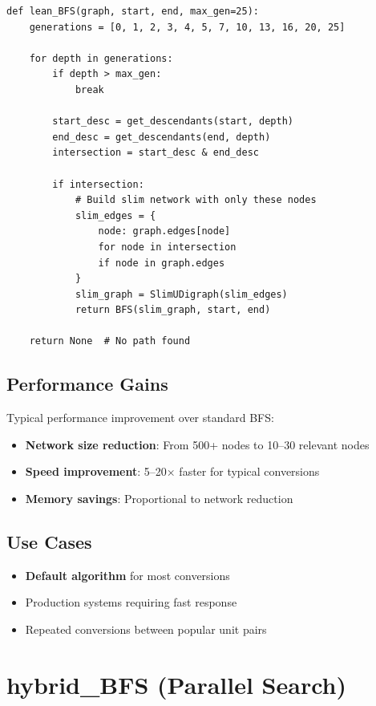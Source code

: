 \documentclass[11pt,a4paper]{report}
\begin{document}
\begin{lstlisting}[style=pythonstyle, caption={lean\_BFS network filtering}]
def lean_BFS(graph, start, end, max_gen=25):
    generations = [0, 1, 2, 3, 4, 5, 7, 10, 13, 16, 20, 25]
    
    for depth in generations:
        if depth > max_gen:
            break
        
        start_desc = get_descendants(start, depth)
        end_desc = get_descendants(end, depth)
        intersection = start_desc & end_desc
        
        if intersection:
            # Build slim network with only these nodes
            slim_edges = {
                node: graph.edges[node] 
                for node in intersection 
                if node in graph.edges
            }
            slim_graph = SlimUDigraph(slim_edges)
            return BFS(slim_graph, start, end)
    
    return None  # No path found
\end{lstlisting}

\subsection{Performance Gains}

Typical performance improvement over standard BFS:
\begin{itemize}[leftmargin=*]
  \item \textbf{Network size reduction}: From 500+ nodes to 10–30 relevant nodes
  \item \textbf{Speed improvement}: 5–20× faster for typical conversions
  \item \textbf{Memory savings}: Proportional to network reduction
\end{itemize}

\subsection{Use Cases}

\begin{itemize}[leftmargin=*]
  \item \textbf{Default algorithm} for most conversions
  \item Production systems requiring fast response
  \item Repeated conversions between popular unit pairs
\end{itemize}

\section{hybrid\_BFS (Parallel Search)}
\end{document}

